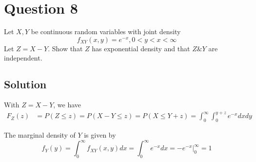 \section*{Question 8}

Let \( X, Y \) be continuous random variables with joint density
\[
    f_{X Y}(x, y)=e^{-x}, 0<y<x<\infty
\]
Let \( Z=X-Y \).
Show that \( Z \) has exponential density and that \( Z \& Y \) are independent.

\subsection*{Solution}

With \( Z=X-Y \), we have
\begin{align*}
    F_{Z}(z)
     &
    = P(Z\leq z)
    = P(X-Y\leq z)
    = P(X\leq Y+z)
    = \int_{0}^{\infty}\int_{0}^{y+z}e^{-x}dx dy
\end{align*}

The marginal density of \( Y \) is given by
\begin{equation*}
    f_{Y}(y)
    =
    \int_{0}^{\infty}f_{X Y}(x, y)dx
    =
    \int_{0}^{\infty}e^{-x}dx
    =
    -e^{-x}\Big|_{0}^{\infty}
    =
    1
\end{equation*}
